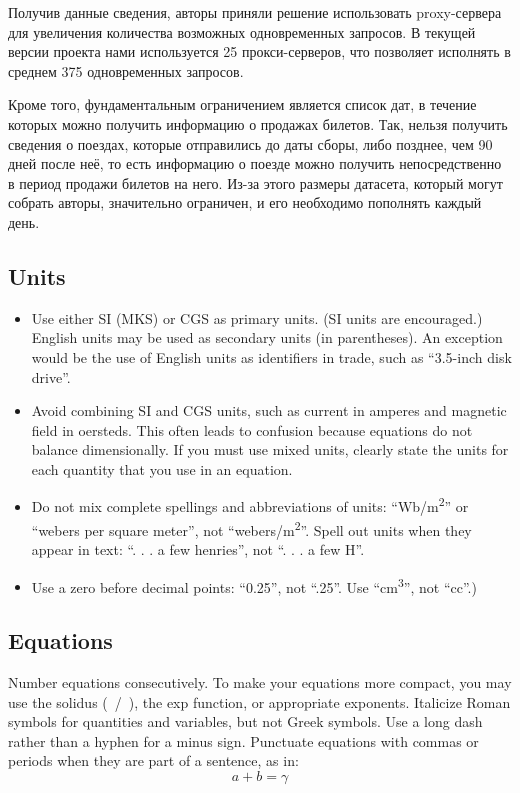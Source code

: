 \documentclass[conference]{IEEEtran}
\begin{document}
Получив данные сведения, авторы приняли решение использовать proxy-сервера для увеличения количества возможных одновременных запросов. В текущей версии проекта нами используется 25 прокси-серверов, что позволяет исполнять в среднем 375 одновременных запросов.

Кроме того, фундаментальным ограничением является список дат, в течение которых можно получить информацию о продажах билетов. Так, нельзя получить сведения о поездах, которые отправились до даты сборы, либо позднее, чем 90 дней после неё, то есть информацию о поезде можно получить непосредственно в период продажи билетов на него. Из-за этого размеры датасета, который могут собрать авторы, значительно ограничен, и его необходимо пополнять каждый день.

\subsection{Units}
\begin{itemize}
\item Use either SI (MKS) or CGS as primary units. (SI units are encouraged.) English units may be used as secondary units (in parentheses). An exception would be the use of English units as identifiers in trade, such as ``3.5-inch disk drive''.
\item Avoid combining SI and CGS units, such as current in amperes and magnetic field in oersteds. This often leads to confusion because equations do not balance dimensionally. If you must use mixed units, clearly state the units for each quantity that you use in an equation.
\item Do not mix complete spellings and abbreviations of units: ``Wb/m\textsuperscript{2}'' or ``webers per square meter'', not ``webers/m\textsuperscript{2}''. Spell out units when they appear in text: ``. . . a few henries'', not ``. . . a few H''.
\item Use a zero before decimal points: ``0.25'', not ``.25''. Use ``cm\textsuperscript{3}'', not ``cc''.)
\end{itemize}

\subsection{Equations}
Number equations consecutively. To make your 
equations more compact, you may use the solidus (~/~), the exp function, or 
appropriate exponents. Italicize Roman symbols for quantities and variables, 
but not Greek symbols. Use a long dash rather than a hyphen for a minus 
sign. Punctuate equations with commas or periods when they are part of a 
sentence, as in:
\begin{equation}
a+b=\gamma\label{eq}
\end{equation}
\end{document}
